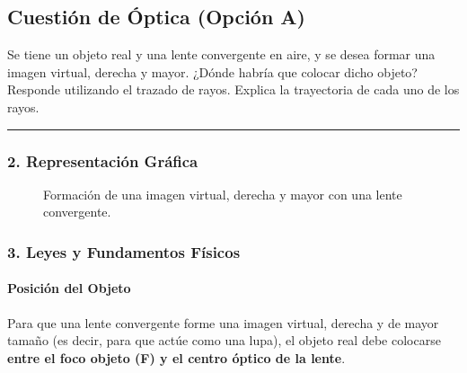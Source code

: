 \newpage

\subsection{Cuestión de Óptica (Opción A)}
\label{subsec:A3_2016_jun_ord_re}

\begin{cajaenunciado}
Se tiene un objeto real y una lente convergente en aire, y se desea formar una imagen virtual, derecha y mayor. ¿Dónde habría que colocar dicho objeto? Responde utilizando el trazado de rayos. Explica la trayectoria de cada uno de los rayos.
\end{cajaenunciado}
\hrule

\subsubsection*{2. Representación Gráfica}
\begin{figure}[H]
    \centering
    \caption{Formación de una imagen virtual, derecha y mayor con una lente convergente.}
\end{figure}

\subsubsection*{3. Leyes y Fundamentos Físicos}
\paragraph{Posición del Objeto}
Para que una lente convergente forme una imagen virtual, derecha y de mayor tamaño (es decir, para que actúe como una lupa), el objeto real debe colocarse \textbf{entre el foco objeto (F) y el centro óptico de la lente}.


